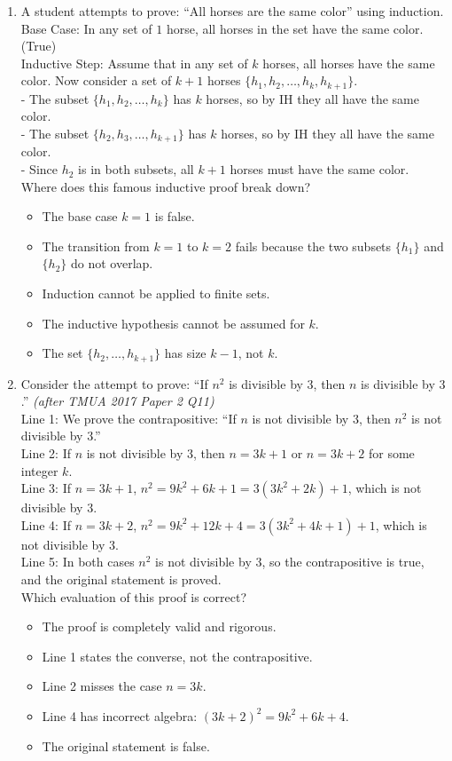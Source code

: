 \documentclass[11pt,a4paper]{article}
\begin{document}
\begin{enumerate}
\item A student attempts to prove: ``All horses are the same color'' using induction.\\
Base Case: In any set of $1$ horse, all horses in the set have the same color. (True)\\
Inductive Step: Assume that in any set of $k$ horses, all horses have the same color. Now consider a set of $k+1$ horses $\{h_1, h_2, \dots, h_k, h_{k+1}\}$.\\
- The subset $\{h_1, h_2, \dots, h_k\}$ has $k$ horses, so by IH they all have the same color.\\
- The subset $\{h_2, h_3, \dots, h_{k+1}\}$ has $k$ horses, so by IH they all have the same color.\\
- Since $h_2$ is in both subsets, all $k+1$ horses must have the same color.\\
Where does this famous inductive proof break down?
\begin{itemize}
\item[A)] The base case $k=1$ is false.
\item[B)] The transition from $k=1$ to $k=2$ fails because the two subsets $\{h_1\}$ and $\{h_2\}$ do not overlap.
\item[C)] Induction cannot be applied to finite sets.
\item[D)] The inductive hypothesis cannot be assumed for $k$.
\item[E)] The set $\{h_2, \dots, h_{k+1}\}$ has size $k-1$, not $k$.
\end{itemize}

\item Consider the attempt to prove: ``If $n^2$ is divisible by $3$, then $n$ is divisible by $3$.'' \textit{\small(after TMUA 2017 Paper 2 Q11)}\\
Line 1: We prove the contrapositive: ``If $n$ is not divisible by $3$, then $n^2$ is not divisible by $3$.''\\
Line 2: If $n$ is not divisible by $3$, then $n = 3k+1$ or $n = 3k+2$ for some integer $k$.\\
Line 3: If $n = 3k+1$, $n^2 = 9k^2 + 6k + 1 = 3(3k^2+2k) + 1$, which is not divisible by $3$.\\
Line 4: If $n = 3k+2$, $n^2 = 9k^2 + 12k + 4 = 3(3k^2+4k+1) + 1$, which is not divisible by $3$.\\
Line 5: In both cases $n^2$ is not divisible by $3$, so the contrapositive is true, and the original statement is proved.\\
Which evaluation of this proof is correct?
\begin{itemize}
\item[A)] The proof is completely valid and rigorous.
\item[B)] Line 1 states the converse, not the contrapositive.
\item[C)] Line 2 misses the case $n = 3k$.
\item[D)] Line 4 has incorrect algebra: $(3k+2)^2 = 9k^2 + 6k + 4$.
\item[E)] The original statement is false.
\end{itemize}


\end{enumerate}
\end{document}
